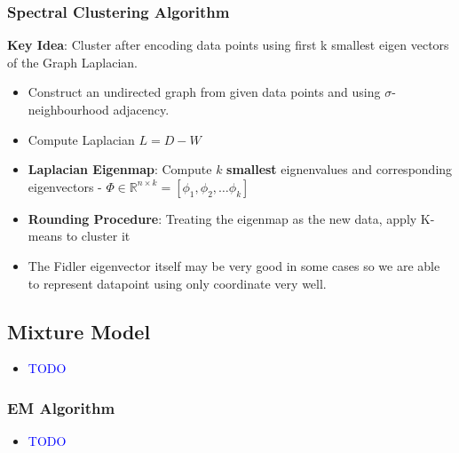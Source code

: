 \documentclass{article}
\newcommand{\blue}[1]{\textcolor{blue}{#1}}
\newcommand{\hrfullline}{\noindent\makebox[\linewidth]{\rule{\paperwidth}{2pt}}}
\begin{document}
\subsubsection{Spectral Clustering Algorithm}
\textbf{Key Idea}: Cluster after encoding data points using first k smallest eigen vectors of the Graph Laplacian.
\begin{itemize}
    \item Construct an undirected graph from given data points and using $\sigma$- neighbourhood adjacency.
    \item Compute Laplacian $L=D-W$
    \item \textbf{Laplacian Eigenmap}:  Compute $k$ \textbf{smallest} eignenvalues and corresponding eigenvectors - $\Phi \in \mathbb{R}^{n \times k} = [\phi_1, \phi_2, \dots \phi_k]$
    \item \textbf{Rounding Procedure}: Treating the eigenmap as the new data, apply K-means to cluster it
    \item The Fidler eigenvector itself may be very good in some cases so we are able to represent datapoint using only coordinate very well.
\end{itemize}




\subsection{Mixture Model}

\begin{itemize}
    \item \blue{TODO}
\end{itemize}

\subsubsection{EM Algorithm}
\begin{itemize}
    \item \blue{TODO}
\end{itemize}

\hrfullline
\newpage
\end{document}
